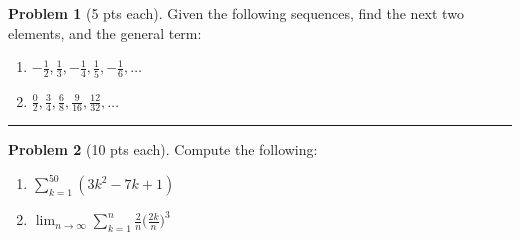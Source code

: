 \documentclass[12pt]{article}
\theoremstyle{definition}
\newtheorem{problem}{Problem}
\begin{document}
\begin{problem}[5 pts each] 
Given the following sequences, find the next two elements, and the general term:
\begin{enumerate}
\item $-\frac{1}{2},\frac{1}{3},-\frac{1}{4},\frac{1}{5},-\frac{1}{6},\dotsc$

\vspace{0.5cm}
\begin{flushright}
\end{flushright}
\item $\frac{0}{2}, \frac{3}{4}, \frac{6}{8}, \frac{9}{16}, \frac{12}{32}, \dotsc$

\vspace{0.5cm}
\begin{flushright}
\end{flushright}
\end{enumerate}
\end{problem}
\hrule

\begin{problem}[10 pts each] 
Compute the following:
\begin{enumerate}
\item $\displaystyle{\sum_{k=1}^{50} (3k^2-7k+1)}$
\vspace{2cm}
\begin{flushright}
\end{flushright}
\item $\displaystyle{\lim_{n\to \infty} \sum_{k=1}^n \frac{2}{n} \bigg( \frac{2k}{n}\bigg)^3}$
\vspace{3.5cm}
\begin{flushright}
\end{flushright}
\end{enumerate}
\end{problem}
\newpage
\end{document}
